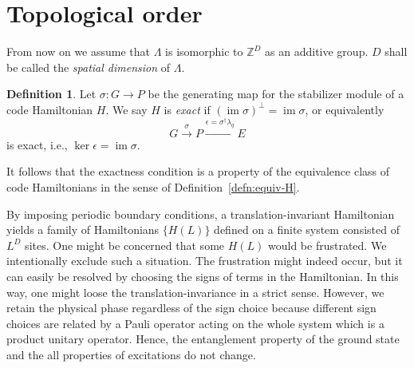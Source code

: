 \documentclass[letterpaper,12pt]{amsart}
\theoremstyle{definition} \newtheorem{defn}{Definition}
\theoremstyle{definition} \newtheorem{rem}{Remark}
\theoremstyle{definition} \newtheorem{example}{Example}
\newcommand{\im}{\mathop{\mathrm{im}}}
\begin{document}
\section{Topological order}
\label{sec:topological-order}
From now on we assume that $\Lambda$ is isomorphic to $\mathbb{Z}^D$ as an additive group.
$D$ shall be called the {\em spatial dimension} of $\Lambda$.

\begin{defn}
Let $\sigma: G \to P$ be the generating map for the stabilizer module of
a code Hamiltonian $H$. We say $H$ is {\em exact}
if $(\im \sigma )^\perp = \im \sigma$, or equivalently
\[
 G \xrightarrow{\sigma} P \xrightarrow{\epsilon=\sigma^\dagger \lambda_q} E
\]
is exact, i.e., $\ker \epsilon = \im \sigma$.
\end{defn}
\noindent It follows that the exactness condition is
a property of the equivalence class of code Hamiltonians in the sense of Definition~\ref{defn:equiv-H}.

By imposing periodic boundary conditions,
a translation-invariant Hamiltonian yields
a family of Hamiltonians $\{ H(L) \}$ defined on a finite system consisted of $L^D$ sites.
One might be concerned that some $H(L)$ would be frustrated.
We intentionally exclude such a situation.
The frustration might indeed occur, but it can easily be resolved
by choosing the signs of terms in the Hamiltonian.
In this way, one might loose the translation-invariance in a strict sense.
However, we retain the physical phase regardless of the sign choice
because different sign choices are related by a Pauli operator acting on
the whole system which is a product unitary operator.
Hence, the entanglement property of the ground state 
and the all properties of excitations do not change.
\end{document}
